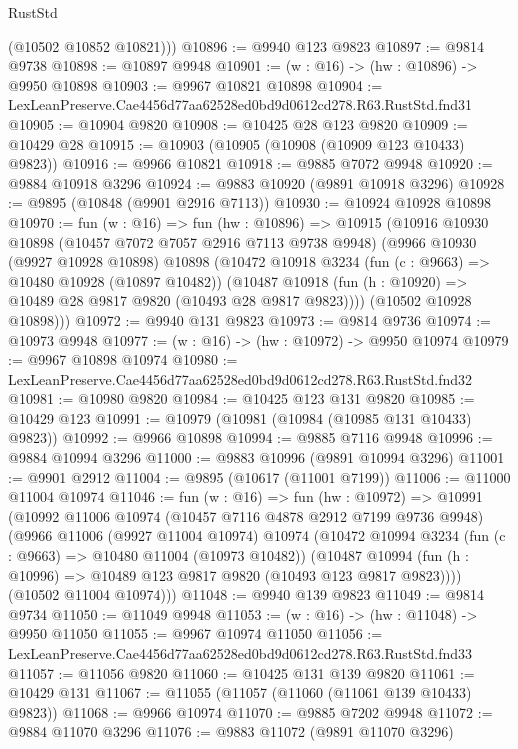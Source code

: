 \begin{lexlean}{RustStd}
\begin{coremodule}
        (@10502 @10852 @10821)))
@10896 := @9940 @123 @9823
@10897 := @9814 @9738
@10898 := @10897 @9948
@10901 := (w : @16) -> (hw : @10896) -> @9950 @10898
@10903 := @9967 @10821 @10898
@10904 := LexLeanPreserve.Cae4456d77aa62528ed0bd9d0612cd278.R63.RustStd.fnd31
@10905 := @10904 @9820
@10908 := @10425 @28 @123 @9820
@10909 := @10429 @28
@10915 := @10903 (@10905 (@10908 (@10909 @123 @10433) @9823))
@10916 := @9966 @10821
@10918 := @9885 @7072 @9948
@10920 := @9884 @10918 @3296
@10924 := @9883 @10920 (@9891 @10918 @3296)
@10928 := @9895 (@10848 (@9901 @2916 @7113))
@10930 := @10924 @10928 @10898
@10970 := fun (w : @16) =>
  fun (hw : @10896) =>
  @10915
    (@10916
      @10930
      @10898
      (@10457 @7072 @7057 @2916 @7113 @9738 @9948)
      (@9966
        @10930
        (@9927 @10928 @10898)
        @10898
        (@10472
          @10918
          @3234
          (fun (c : @9663) => @10480 @10928 (@10897 @10482))
          (@10487 @10918 (fun (h : @10920) => @10489 @28 @9817 @9820 (@10493 @28 @9817 @9823))))
        (@10502 @10928 @10898)))
@10972 := @9940 @131 @9823
@10973 := @9814 @9736
@10974 := @10973 @9948
@10977 := (w : @16) -> (hw : @10972) -> @9950 @10974
@10979 := @9967 @10898 @10974
@10980 := LexLeanPreserve.Cae4456d77aa62528ed0bd9d0612cd278.R63.RustStd.fnd32
@10981 := @10980 @9820
@10984 := @10425 @123 @131 @9820
@10985 := @10429 @123
@10991 := @10979 (@10981 (@10984 (@10985 @131 @10433) @9823))
@10992 := @9966 @10898
@10994 := @9885 @7116 @9948
@10996 := @9884 @10994 @3296
@11000 := @9883 @10996 (@9891 @10994 @3296)
@11001 := @9901 @2912
@11004 := @9895 (@10617 (@11001 @7199))
@11006 := @11000 @11004 @10974
@11046 := fun (w : @16) =>
  fun (hw : @10972) =>
  @10991
    (@10992
      @11006
      @10974
      (@10457 @7116 @4878 @2912 @7199 @9736 @9948)
      (@9966
        @11006
        (@9927 @11004 @10974)
        @10974
        (@10472
          @10994
          @3234
          (fun (c : @9663) => @10480 @11004 (@10973 @10482))
          (@10487 @10994 (fun (h : @10996) => @10489 @123 @9817 @9820 (@10493 @123 @9817 @9823))))
        (@10502 @11004 @10974)))
@11048 := @9940 @139 @9823
@11049 := @9814 @9734
@11050 := @11049 @9948
@11053 := (w : @16) -> (hw : @11048) -> @9950 @11050
@11055 := @9967 @10974 @11050
@11056 := LexLeanPreserve.Cae4456d77aa62528ed0bd9d0612cd278.R63.RustStd.fnd33
@11057 := @11056 @9820
@11060 := @10425 @131 @139 @9820
@11061 := @10429 @131
@11067 := @11055 (@11057 (@11060 (@11061 @139 @10433) @9823))
@11068 := @9966 @10974
@11070 := @9885 @7202 @9948
@11072 := @9884 @11070 @3296
@11076 := @9883 @11072 (@9891 @11070 @3296)

\end{coremodule}
\end{lexlean}
